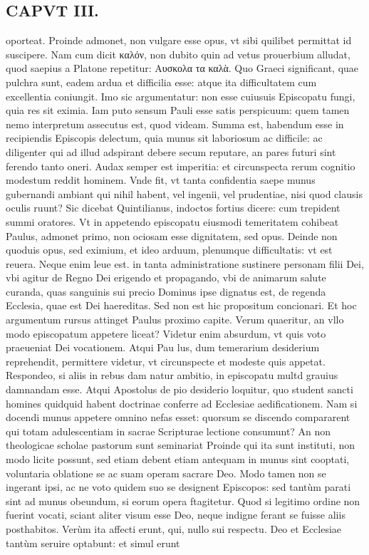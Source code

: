 \documentclass{article}
\begin{document}
\begin{pages}
\section*{CAPVT III. }
\marginpar{[ p.31 ]}\pstart oporteat. Proinde admonet, non vulgare esse opus, vt sibi quilibet permittat id suscipere. Nam cum dicit καλόν, non dubito quin ad vetus prouerbium alludat, quod saepius a Platone repetitur: Αυσκολα τα καλὰ. Quo Graeci significant, quae pulchra sunt, eadem ardua et difficilia esse: atque ita difficultatem cum excellentia coniungit. Imo sic argumentatur: non esse cuiusuis Episcopatu fungi, quia res sit eximia. Iam puto sensum Pauli esse satis perspicuum: quem tamen nemo interpretum assecutus est, quod videam. Summa est, habendum esse in recipiendis Episcopis delectum, quia munus sit laboriosum ac difficile: ac diligenter qui ad illud adspirant debere secum reputare, an pares futuri sint ferendo tanto oneri. Audax semper est imperitia: et circunspecta rerum cognitio modestum reddit hominem. Vnde fit, vt tanta confidentia saepe munus gubernandi ambiant qui nihil habent, vel ingenii, vel prudentiae, nisi quod clausis oculis ruunt? Sic dicebat Quintilianus, indoctos fortius dicere: cum trepident summi oratores. Vt in appetendo episcopatu eiusmodi temeritatem cohibeat Paulus, admonet primo, non ociosam esse dignitatem, sed opus. Deinde non quoduis opus, sed eximium, et ideo arduum, plenumque difficultatis: vt est reuera. Neque enim leue est. in tanta administratione sustinere personam filii Dei, vbi agitur de Regno Dei erigendo et propagando, vbi de animarum salute curanda, quas sanguinis sui precio Dominus ipse dignatus est, de regenda Ecclesia, quae est Dei haereditas. Sed non est hic propositum concionari. Et hoc argumentum rursus attinget Paulus proximo capite. Verum quaeritur, an vllo modo episcopatum appetere liceat? Videtur enim absurdum, vt quis voto praeueniat Dei vocationem. Atqui Pau lus, dum temerarium desiderium reprehendit, permittere videtur, vt circunspecte et modeste quis appetat. Respondeo, si aliis in rebus dam natur ambitio, in episcopatu multd grauius damnandam esse. Atqui Apostolus de pio desiderio loquitur, quo student sancti homines quidquid habent doctrinae conferre ad Ecclesiae aedificationem. Nam si docendi munus appetere omnino nefas esset: quorsum se discendo compararent qui totam adulescentiam in sacrae Scripturae lectione consumunt? An non theologicae scholae pastorum sunt seminariat Proinde qui ita sunt instituti, non modo licite possunt, sed etiam debent etiam antequam in munus sint cooptati, voluntaria oblatione se ac suam operam sacrare Deo. Modo tamen non se ingerant ipsi, ac ne voto quidem suo se designent Episcopos: sed tantùm parati sint ad munus obeundum, si eorum opera ftagitetur. Quod si legitimo ordine non fuerint vocati, sciant aliter visum esse Deo, neque indigne ferant se fuisse aliis posthabitos. Verùm ita affecti erunt, qui, nullo sui respectu. Deo et Ecclesiae tantùm seruire optabunt: et simul erunt  \pend

\end{pages}
\end{document}
